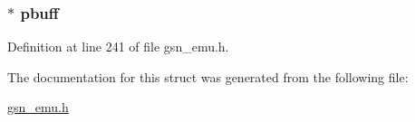 \hypertarget{a00063_a994ae3a32b81cbe8604948bdb4ec2c9d}{
\subsubsection[{pbuff}]{$\ast$ {\bf pbuff}}}
\label{a00063_a994ae3a32b81cbe8604948bdb4ec2c9d}


Definition at line 241 of file gsn\_\-emu.h.



The documentation for this struct was generated from the following file:\begin{DoxyCompactItemize}
\item 
\hyperlink{a00489}{gsn\_\-emu.h}\end{DoxyCompactItemize}
